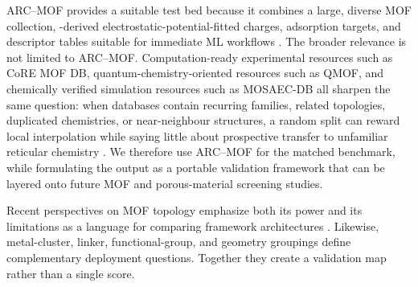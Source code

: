 \documentclass[11pt,a4paper]{article}
\newcommand{\del}[1]{}
\begin{document}
ARC--MOF provides a suitable test bed because it combines a large, diverse MOF collection, -derived electrostatic-potential-fitted charges, adsorption targets, and descriptor tables suitable for immediate ML workflows \citep{Burner2023ARCMOF}. The broader relevance is not limited to ARC--MOF. Computation-ready experimental resources such as CoRE MOF DB, quantum-chemistry-oriented resources such as QMOF, and chemically verified simulation resources such as MOSAEC-DB all sharpen the same question: when databases contain recurring families, related topologies, duplicated chemistries, or near-neighbour structures, a random split can reward local interpolation while saying little about prospective transfer to unfamiliar reticular chemistry \citep{Chung2014CoREMOF,Chung2019CoRE2019,Rosen2021QMOF,Zhao2025CoREMOF,Gibaldi2025MOSAEC}. We therefore use ARC--MOF for the matched benchmark, while formulating the output as a portable validation framework that can be layered onto future MOF and porous-material screening studies.

\del{Topology is a useful stress test because it is a compact label for framework connectivity, design lineage, pore-network constraints, and sometimes synthetic family, even though it is not a complete mechanistic descriptor of adsorption.} Recent perspectives on MOF topology emphasize both its power and its limitations as a language for comparing framework architectures \citep{Glasby2024Topology}. \del{We therefore use topology grouping not to claim that topology alone controls gas uptake, but to impose a severe structural-extrapolation stress test.} Likewise, metal-cluster, linker, functional-group, and geometry groupings define complementary deployment questions. Together they create a validation map rather than a single score.


\end{document}
